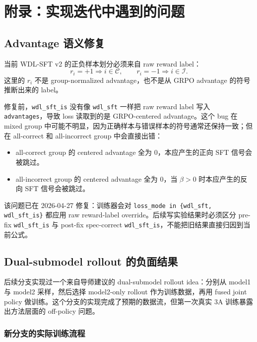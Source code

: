 \appendix

\section{附录：实现迭代中遇到的问题}
\label{app:wdl_sft_issues}

\subsection{Advantage 语义修复}
\label{app:advantage_fix}

当前 WDL-SFT v2 的正负样本划分必须来自 raw reward label：
\begin{equation}
    r_i=+1 \Rightarrow i\in\mathcal{C},
    \qquad
    r_i=-1 \Rightarrow i\in\mathcal{I}.
\end{equation}
这里的 $r_i$ 不是 group-normalized advantage，也不是从 GRPO advantage 的符号推断出来的 label。

修复前，\texttt{wdl\_sft\_is} 没有像 \texttt{wdl\_sft} 一样把 raw reward label 写入 \texttt{advantages}，导致 loss 读取到的是 GRPO-centered advantage。这个 bug 在 mixed group 中可能不明显，因为正确样本与错误样本的符号通常还保持一致；但在 all-correct 和 all-incorrect group 中会直接出错：
\begin{itemize}
    \item all-correct group 的 centered advantage 全为 $0$，本应产生的正向 SFT 信号会被跳过。
    \item all-incorrect group 的 centered advantage 全为 $0$，当 $\beta>0$ 时本应产生的反向 SFT 信号会被跳过。
\end{itemize}

该问题已在 2026-04-27 修复：训练器会对 \texttt{loss\_mode in \{wdl\_sft, wdl\_sft\_is\}} 都应用 raw reward-label override。后续写实验结果时必须区分 pre-fix \texttt{wdl\_sft\_is} 与 post-fix spec-correct \texttt{wdl\_sft\_is}，不能把旧结果直接归因到当前公式。

\subsection{Dual-submodel rollout 的负面结果}
\label{app:dual_rollout_failure}

后续分支实现过一个来自导师建议的 dual-submodel rollout idea：分别从 model1 与 model2 采样，然后选择 model2-only rollout 作为训练数据，再用 fused joint policy 做训练。这个分支的实现完成了预期的数据流，但第一次真实 3A 训练暴露出方法层面的 off-policy 问题。

\subsubsection{新分支的实际训练流程}
\label{app:dual_rollout_flow}


